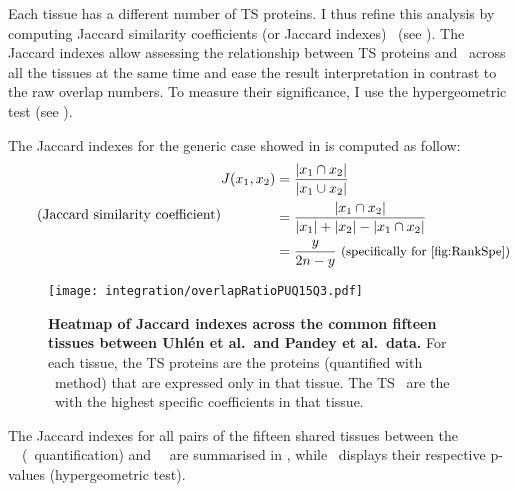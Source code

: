 Each tissue has a different number of \gls{TS} proteins.
I thus refine this analysis
by computing Jaccard similarity coefficients
(or Jaccard indexes)~
(see ).
The Jaccard indexes allow assessing
the relationship between \gls{TS} proteins and \mRNAs\
across all the tissues at the same time
and ease the result interpretation in contrast to the raw overlap numbers.
To measure their significance,
I use the hypergeometric test (see ).

\begin{minipage}{\textwidth}
    The Jaccard indexes for the generic case showed in 
    is computed as follow:
\begin{equation}
    \tag{Jaccard similarity coefficient}\label{eq:Jaccard}
    \begin{split}
        J(x_{1},x_{2}) & = \frac{\left | x_{1}\cap  x_{2}\right |}%
                                {\left | x_{1}\cup  x_{2}\right |}\\
                       & = \frac{\left | x_{1}\cap  x_{2}\right |}%
                                {\left | x_{1} \right | + \left | x_{2} \right |%
                                - \left | x_{1}\cap  x_{2}\right |}\\
                                & = \frac{y}{2n-y} \text{\small{~(specifically
                                for~\Cref{fig:RankSpe})}}\\
    \end{split}
    \raisetag{6cm}
\end{equation}
\end{minipage}


\begin{figure}[!htb]
    \texttt{[image: integration/overlapRatioPUQ15Q3.pdf]}\centering
    \vspace{-2mm}
\caption[Heatmap of Jaccard indexes across 15 tissues]{%
\label{fig:JaccardIndexes}\label{fig:RatioJac}\textbf{Heatmap of Jaccard indexes
across the common fifteen tissues between Uhlén et al.\ and Pandey et al.\ data.}
For each tissue, the \gls{TS} proteins are the proteins
(quantified with \PPKM\ method) that are expressed only in that tissue.
The \gls{TS} \mRNAs\ are the \mRNAs\ with the highest specific coefficients
in that tissue.}
\vspace{-4mm}
\end{figure}

The Jaccard indexes for all pairs of the fifteen shared tissues
between the \pandey\ \etal\ (\PPKM\ quantification) and \uhlen\ \etal\
are summarised in ,
while~\Cref{fig:JaccardPvalues} displays
their respective p-values (hypergeometric test).\\
\vspace{-\baselineskip}


